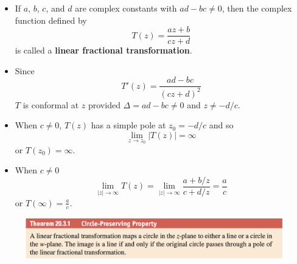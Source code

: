 \documentclass{article}
\begin{document}
\begin{itemize}
  \item If $a$, $b$, $c$, and $d$ are complex constants with $a d - b c \ne 0$, then the complex function defined by \[T(z) = \frac{a z + b}{c z + d}\] is called a \textbf{linear fractional transformation}.

  \item Since \[T'(z) = \frac{a d - b c}{(c z + d)^2}\] $T$ is conformal at $z$ provided $\Delta = a d - b c \ne 0$ and $z \ne -d / c$.

  \item When $c \ne 0$, $T(z)$ has a simple pole at $z_0 = -d / c$ and so \[\lim_{z \rightarrow z_0} |T(z)| = \infty\] or $T(z_0) = \infty$.

  \item When $c \ne 0$ \[\lim_{|z| \rightarrow \infty} T(z) = \lim_{|z| \rightarrow \infty} \frac{a + b / z}{c + d / z} = \frac{a}{c}\] or $T(\infty) = \frac{a}{c}$.
\end{itemize}

\begin{figure}[H]
  \centering
  \includegraphics[width=\textwidth]{circle-preserving-property}
\end{figure}
\end{document}
